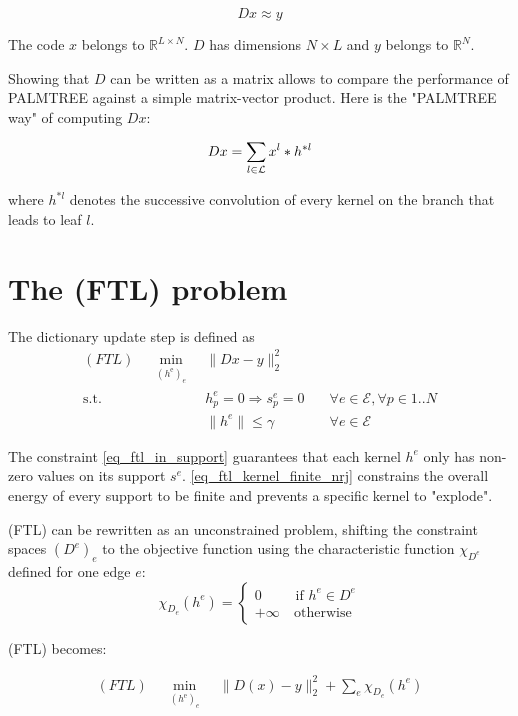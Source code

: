 $$Dx \approx y$$

The code $x$ belongs to $\mathbb{R}^{L\times N}$. $D$ has dimensions $N \times L$ and $y$ belongs to $\mathbb{R}^N$. 

Showing that $D$ can be written as a matrix allows to compare the performance of PALMTREE against a simple matrix-vector product. Here is the "PALMTREE way" of computing $Dx$:

\begin{align}
	Dx = \sum_{l \in \mathcal L} x^{l} * h^{*l}	 \label{eq_Dx_as_convolution}
\end{align}

where $h^{*l}$ denotes the successive convolution of every kernel on the branch that leads to leaf $l$.



\section{The (FTL) problem}

The dictionary update step is defined as 
\begin{align}
(FTL) \quad \underset{\substack{(h^\text{e})_{e}}}\min & \lVert Dx - y \rVert_2^2 \label{eq_ftl_energy}\\
\text{s.t. } & h^e_p = 0 \Rightarrow  s^e_p=0 \quad & \forall e \in \mathcal{E}, \forall p \in 1..N \label{eq_ftl_in_support} \\
 & \lVert h^e \rVert \le \gamma & \forall e \in \mathcal{E}\label{eq_ftl_kernel_finite_nrj}
\end{align}

The constraint \ref{eq_ftl_in_support} guarantees that each kernel $h^e$ only has non-zero values on its support $s^e$. \ref{eq_ftl_kernel_finite_nrj} constrains the overall energy of every support to be finite and prevents a specific kernel to "explode".

(FTL) can be rewritten as an unconstrained problem, shifting the constraint spaces $(D^e)_e$ to the objective function using the characteristic function $\chi_{D^e}$ defined for one edge $e$:
$$\chi_{D_e}(h^e) = \begin{cases} 0 &\text{ if } h^e \in D^e \\ +\infty & \ \text{otherwise}\end{cases}$$

(FTL) becomes:

\begin{align}
(FTL) \quad \underset{\substack{(h^\text{e})_{e}}}\min & \lVert D(x) - y \rVert_2^2 + \sum_{e}\chi_{D_e} (h^e)
\end{align}

